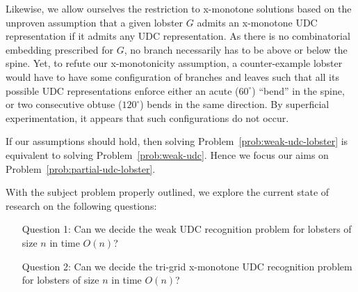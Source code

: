 Likewise, we allow ourselves the restriction to x-monotone solutions based on the unproven assumption that a given lobster $G$ admits an x-monotone UDC representation if it admits any UDC representation. As there is no combinatorial embedding prescribed for $G$, no branch necessarily has to be above or below the spine. Yet, to refute our x-monotonicity assumption, a counter-example lobster would have to have some configuration of branches and leaves such that all its possible UDC representations enforce either an acute ($60^\circ$) ``bend'' in the spine, or two consecutive obtuse ($120^\circ$) bends in the same direction. By superficial experimentation, it appears that such configurations do not occur.

If our assumptions should hold, then solving Problem~\ref{prob:weak-udc-lobster} is equivalent to solving Problem~\ref{prob:weak-udc}. Hence we focus our aims on Problem~\ref{prob:partial-udc-lobster}.

With the subject problem properly outlined, we explore the current state of research on the following questions:

\begin{enumerate}
    \item[Question 1:] Can we decide the weak UDC recognition problem for lobsters of size $n$ in time $O(n)$?
    \item[Question 2:] Can we decide the tri-grid x-monotone UDC recognition problem for lobsters of size $n$ in time $O(n)$?
\end{enumerate}

